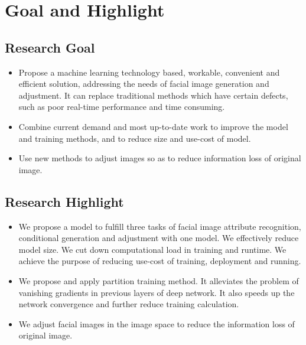 \section{Goal and Highlight}

\subsection{Research Goal}
\begin{itemize}
\item
Propose a machine learning technology based, workable, convenient and efficient solution,
    addressing the needs of facial image generation and adjustment.
It can replace traditional methods which have certain defects, such as poor real-time performance and time consuming.
\item
Combine current demand and most up-to-date work to improve the model and training methods,
    and to reduce size and use-cost of model.
\item
Use new methods to adjust images so as to reduce information loss of original image.
\end{itemize}
\subsection{Research Highlight}
\begin{itemize}
\item
We propose a model to fulfill three tasks of facial image attribute recognition,
    conditional generation and adjustment with one model.
We effectively reduce model size.
We cut down computational load in training and runtime.
We achieve the purpose of reducing use-cost of training, deployment and running.
\item
We propose and apply partition training method.
It alleviates the problem of vanishing gradients in previous layers of deep network.
It also speeds up the network convergence and further reduce training calculation.

\item
We adjust facial images in the image space to reduce the information loss of original image.
\end{itemize}
